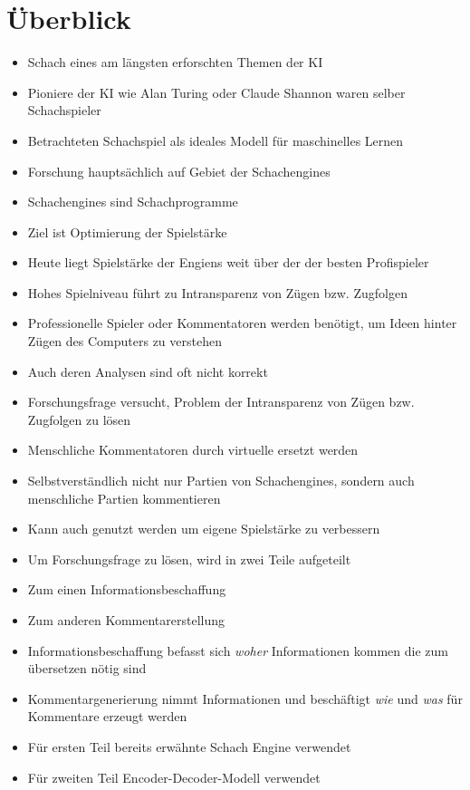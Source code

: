 \section{Überblick}

\begin{itemize}[leftmargin=*]
\item Schach eines am längsten erforschten Themen der KI
\item Pioniere der KI wie Alan Turing oder Claude Shannon waren selber Schachspieler
\item Betrachteten Schachspiel als ideales Modell für maschinelles Lernen
\item Forschung hauptsächlich auf Gebiet der Schachengines
\item Schachengines sind Schachprogramme
\item Ziel ist Optimierung der Spielstärke
\item Heute liegt Spielstärke der Engiens weit über der der besten Profispieler
\item Hohes Spielniveau führt zu Intransparenz von Zügen bzw. Zugfolgen
\item Professionelle Spieler oder Kommentatoren werden benötigt, um Ideen hinter Zügen des Computers zu verstehen
\item Auch deren Analysen sind oft nicht korrekt
\end{itemize}

\newpage

\begin{itemize}[leftmargin=*]
\item Forschungsfrage versucht, Problem der Intransparenz von Zügen bzw. Zugfolgen zu lösen
\item Menschliche Kommentatoren durch virtuelle ersetzt werden
\item Selbstverständlich nicht nur Partien von Schachengines, sondern auch menschliche Partien kommentieren
\item Kann auch genutzt werden um eigene Spielstärke zu verbessern
\end{itemize}

\newpage


\begin{itemize}[leftmargin=*]
\item Um Forschungsfrage zu lösen, wird in zwei Teile aufgeteilt
\item Zum einen Informationsbeschaffung
\item Zum anderen Kommentarerstellung
\item Informationsbeschaffung befasst sich \textit{woher} Informationen kommen die zum übersetzen nötig sind
\item Kommentargenerierung nimmt Informationen und beschäftigt \textit{wie} und \textit{was} für Kommentare erzeugt werden
\item Für ersten Teil bereits erwähnte Schach Engine verwendet
\item Für zweiten Teil Encoder-Decoder-Modell verwendet
\end{itemize}